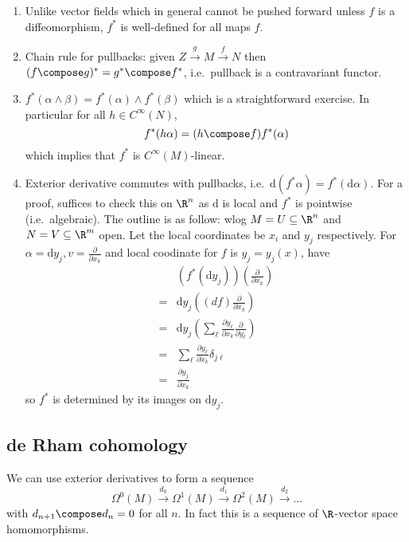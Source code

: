 \documentclass[a4paper]{article}
\newcommand{\w}{\wedge}
\begin{document}
\begin{note}\leavevmode
  \begin{enumerate}
  \item Unlike vector fields which in general cannot be pushed forward unless \(f\) is a diffeomorphism, \(f^*\) is well-defined for all maps \(f\).
  \item Chain rule for pullbacks: given \(Z \xrightarrow{g} M \xrightarrow{f} N\) then \((f \compose g)^* = g^* \compose f^*\), i.e.\ pullback is a contravariant functor.
  \item \(f^*(\alpha \w \beta) = f^*(\alpha) \w f^*(\beta)\) which is a straightforward exercise. In particular for all \(h \in C^\infty(N)\),
    \[
      f^*(h \alpha) = (h \compose f) f^*(\alpha)
    \]
    which implies that \(f^*\) is \(C^\infty(M)\)-linear.
  \item Exterior derivative commutes with pullbacks, i.e.\ \(\mathrm d (f^*\alpha) = f^*(\mathrm d \alpha)\). For a proof, suffices to check this on \(\R^n\) as \(\mathrm d\) is local and \(f^*\) is pointwise (i.e.\ algebraic). The outline is as follow: wlog \(M = U \subseteq \R^n\) and \(N = V \subseteq \R^m\) open. Let the local coordinates be \(x_i\) and \(y_j\) respectively. For \(\alpha = \mathrm dy_j, v = \frac{\partial  }{\partial x_k}\) and local coodinate for \(f\) is \(y_j = y_j(x)\), have
    \begin{align*}
      &(f^* (\mathrm d y_j)) (\frac{\partial  }{\partial x_k}) \\
      =& \mathrm d y_j ((df) \frac{\partial  }{\partial x_k}) \\
      =& \mathrm d y_j (\sum_\ell \frac{\partial y_\ell}{\partial x_k} \frac{\partial  }{\partial y_\ell}) \\
      =& \sum_\ell \frac{\partial y_\ell}{\partial x_k} \delta_{j \ell} \\
      =& \frac{\partial y_j}{\partial x_k}
    \end{align*}
    so \(f^*\) is determined by its images on \(\mathrm dy_j\).
  \end{enumerate}
\end{note}

\subsection{de Rham cohomology}

We can use exterior derivatives to form a sequence
\[
  \Omega^0(M) \xrightarrow{d_0} \Omega^1(M) \xrightarrow{d_1} \Omega^2(M) \xrightarrow{d_2} \dots
\]
with \(d_{n + 1} \compose d_n = 0\) for all \(n\). In fact this is a sequence of \(\R\)-vector space homomorphisms.
\end{document}
